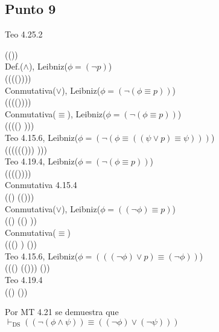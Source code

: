 \documentclass{article}
\begin{document}
\subsection{Punto 9}
\begin{logicenv}{Teo 4.25.2}
    \begin{derivation}
        (\neg (\phi \land \psi))\\
    Def.($\land$), Leibniz($\phi = (\neg p)$)\\
        (\neg (\phi \equiv (\psi \equiv (\phi \lor \psi))))\\
    Conmutativa($\lor$), Leibniz($\phi = (\neg (\phi \equiv p))$)\\
        (\neg (\phi \equiv(\psi \equiv (\psi \lor \phi))))\\
    Conmutativa($\equiv$), Leibniz($\phi = (\neg (\phi \equiv p))$)\\
        (\neg (\phi \equiv ((\psi \lor \phi) \equiv \psi)))\\
    Teo 4.15.6, Leibniz($\phi = (\neg (\phi \equiv ((\psi \lor p) \equiv \psi)))$)\\
        (\neg (\phi \equiv ((\psi \lor (\neg (\neg \phi))) \equiv \psi)))\\
    Teo 4.19.4, Leibniz($\phi = (\neg (\phi \equiv p))$)\\
        (\neg (\phi \equiv (\psi \lor (\neg \phi))))\\
    Conmutativa 4.15.4\\
        ((\neg \phi) \equiv (\psi \lor (\neg \phi)))\\
    Conmutativa($\lor$), Leibniz($\phi = ((\neg \phi) \equiv p)$)\\
        ((\neg \phi) \equiv ((\neg \phi) \lor \psi))\\
    Conmutativa($\equiv$)\\
        (((\neg \phi) \lor \psi) \equiv (\neg \phi))\\
    Teo 4.15.6, Leibniz($\phi = (((\neg \phi) \lor p) \equiv (\neg \phi))$)\\
        (((\neg \phi) \lor (\neg(\neg \psi))) \equiv (\neg \phi))\\
    Teo 4.19.4\\
        ((\neg \phi) \lor (\neg \psi))
    \end{derivation}
    Por MT 4.21 se demuestra que\\
    $\vdash_{\text{DS}} ((\neg (\phi \land \psi)) \equiv ((\neg \phi) \lor (\neg \psi)))$
\end{logicenv}
\end{document}
